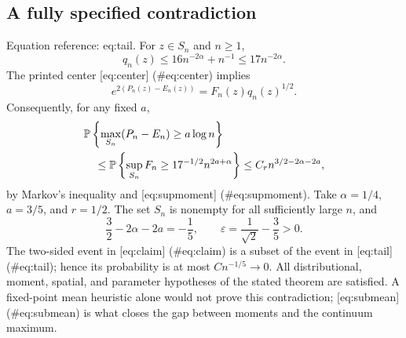 \documentclass[10pt]{article}
\begin{document}
\subsection*{A fully specified contradiction}
Equation reference: eq:tail. For \(z\in S_n\) and \(n\ge1\), \[q_n(z)\le16n^{-2\alpha}+n^{-1}\le17n^{-2\alpha}.\] The printed center [eq:center] (\#eq:center) implies \[e^{2(P_n(z)-E_n(z))}=F_n(z)q_n(z)^{1/2}.\] Consequently, for any fixed \(a\), \[\begin{aligned}
 &\mathbb P\left\{\max_{S_n}(P_n-E_n)\ge a\log n\right\}
 \notag\\
 &\quad\le
 \mathbb P\left\{\sup_{S_n}F_n
                 \ge17^{-1/2}n^{2a+\alpha}\right\}
 \le C_r n^{3/2-2\alpha-2a},                     \end{aligned}\] by Markov’s inequality and [eq:supmoment] (\#eq:supmoment). Take \(\alpha=1/4\), \(a=3/5\), and \(r=1/2\). The set \(S_n\) is nonempty for all sufficiently large \(n\), and \[\frac32-2\alpha-2a=-\frac15,\qquad
 \varepsilon=\frac1{\sqrt2}-\frac35>0.\] The two-sided event in [eq:claim] (\#eq:claim) is a subset of the event in [eq:tail] (\#eq:tail); hence its probability is at most \(C n^{-1/5}\to0\). All distributional, moment, spatial, and parameter hypotheses of the stated theorem are satisfied. A fixed-point mean heuristic alone would not prove this contradiction; [eq:submean] (\#eq:submean) is what closes the gap between moments and the continuum maximum.\par
\end{document}
